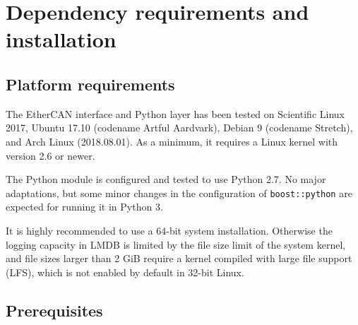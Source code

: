 \documentclass[fontsize=12,a4paper]{scrreprt}
\begin{document}
\chapter{Dependency requirements and installation}
\label{sec:installationfromscratch}

\minitoc

\section{Platform requirements}

The EtherCAN interface and Python layer has been tested on Scientific
Linux 2017, Ubuntu 17.10 (codename Artful Aardvark), Debian 9
(codename Stretch), and Arch Linux (2018.08.01). As a minimum, it
requires a Linux kernel with version 2.6 or newer.

The Python module is configured and tested to use Python 2.7.  No
major adaptations, but some minor changes in the configuration of
\texttt{boost::python} are expected for running it in Python 3.

It is highly recommended to use a 64-bit system
installation. Otherwise the logging capacity in LMDB is limited by the
file size limit of the system kernel, and file sizes larger than 2 GiB
require a kernel compiled with large file support (LFS), which is not
enabled by default in 32-bit Linux.


\section{Prerequisites}
\end{document}
